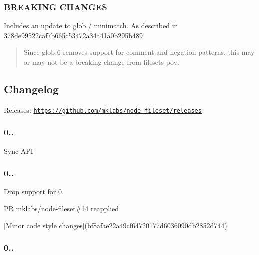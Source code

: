 \subsubsection*{B\+R\+E\+A\+K\+I\+NG C\+H\+A\+N\+G\+ES}


\begin{DoxyItemize}
\item Includes an update to glob / minimatch. As described in 378de99522caf7b665c53472a34a41a0b295b489
\end{DoxyItemize}

\begin{quote}
Since glob 6 removes support for comment and negation patterns, this may or may not be a breaking change from fileset\textquotesingle{}s pov. \end{quote}


\subsection*{Changelog}


\begin{DoxyItemize}
\item Releases\+: \href{https://github.com/mklabs/node-fileset/releases}{\tt https\+://github.\+com/mklabs/node-\/fileset/releases}
\end{DoxyItemize}

\subsubsection*{0..}


\begin{DoxyItemize}
\item Sync A\+PI
\end{DoxyItemize}

\subsubsection*{0..}


\begin{DoxyItemize}
\item Drop support for 0.
\item PR mklabs/node-\/fileset\#14 reapplied
\item \mbox{[}Minor code style changes\mbox{]}(bf8afae22a49cf64720177d6036090db2852d744)
\end{DoxyItemize}

\subsubsection*{0..}


